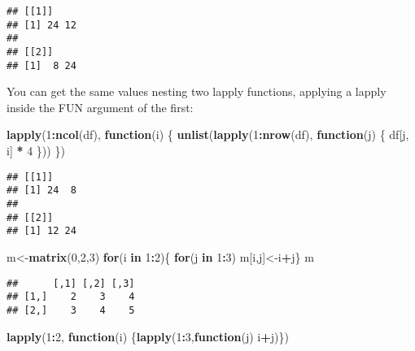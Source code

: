 \documentclass[
]{article}
\newenvironment{Shaded}{\begin{snugshade}}{\end{snugshade}}
\newcommand{\ControlFlowTok}[1]{\textcolor[rgb]{0.13,0.29,0.53}{\textbf{#1}}}
\newcommand{\DecValTok}[1]{\textcolor[rgb]{0.00,0.00,0.81}{#1}}
\newcommand{\FunctionTok}[1]{\textcolor[rgb]{0.13,0.29,0.53}{\textbf{#1}}}
\newcommand{\NormalTok}[1]{#1}
\newcommand{\OtherTok}[1]{\textcolor[rgb]{0.56,0.35,0.01}{#1}}
\newcommand{\SpecialCharTok}[1]{\textcolor[rgb]{0.81,0.36,0.00}{\textbf{#1}}}
\begin{document}
\begin{verbatim}
## [[1]]
## [1] 24 12
## 
## [[2]]
## [1]  8 24
\end{verbatim}

You can get the same values nesting two lapply functions, applying a
lapply inside the FUN argument of the first:

\begin{Shaded}
\begin{Highlighting}[]
\FunctionTok{lapply}\NormalTok{(}\DecValTok{1}\SpecialCharTok{:}\FunctionTok{ncol}\NormalTok{(df), }\ControlFlowTok{function}\NormalTok{(i) \{}
       \FunctionTok{unlist}\NormalTok{(}\FunctionTok{lapply}\NormalTok{(}\DecValTok{1}\SpecialCharTok{:}\FunctionTok{nrow}\NormalTok{(df), }\ControlFlowTok{function}\NormalTok{(j) \{}
\NormalTok{              df[j, i] }\SpecialCharTok{*} \DecValTok{4}
\NormalTok{       \}))}
\NormalTok{\})}
\end{Highlighting}
\end{Shaded}

\begin{verbatim}
## [[1]]
## [1] 24  8
## 
## [[2]]
## [1] 12 24
\end{verbatim}

\begin{Shaded}
\begin{Highlighting}[]
\NormalTok{m}\OtherTok{\textless{}{-}}\FunctionTok{matrix}\NormalTok{(}\DecValTok{0}\NormalTok{,}\DecValTok{2}\NormalTok{,}\DecValTok{3}\NormalTok{)}
\ControlFlowTok{for}\NormalTok{(i }\ControlFlowTok{in} \DecValTok{1}\SpecialCharTok{:}\DecValTok{2}\NormalTok{)\{ }\ControlFlowTok{for}\NormalTok{(j }\ControlFlowTok{in} \DecValTok{1}\SpecialCharTok{:}\DecValTok{3}\NormalTok{) m[i,j]}\OtherTok{\textless{}{-}}\NormalTok{i}\SpecialCharTok{+}\NormalTok{j\}}
\NormalTok{m}
\end{Highlighting}
\end{Shaded}

\begin{verbatim}
##      [,1] [,2] [,3]
## [1,]    2    3    4
## [2,]    3    4    5
\end{verbatim}

\begin{Shaded}
\begin{Highlighting}[]
\FunctionTok{lapply}\NormalTok{(}\DecValTok{1}\SpecialCharTok{:}\DecValTok{2}\NormalTok{, }\ControlFlowTok{function}\NormalTok{(i) \{}\FunctionTok{lapply}\NormalTok{(}\DecValTok{1}\SpecialCharTok{:}\DecValTok{3}\NormalTok{,}\ControlFlowTok{function}\NormalTok{(j) i}\SpecialCharTok{+}\NormalTok{j)\})}
\end{Highlighting}
\end{Shaded}
\end{document}
